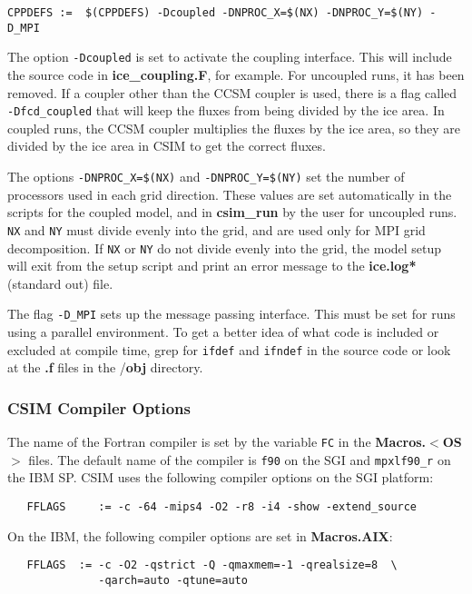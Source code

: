 \begin{verbatim}
CPPDEFS :=  $(CPPDEFS) -Dcoupled -DNPROC_X=$(NX) -DNPROC_Y=$(NY) -D_MPI
\end{verbatim}

The option {\tt -Dcoupled} is set to activate the coupling interface.  This 
will include the source code in {\bf ice\_coupling.F}, for example.  For uncoupled
runs, it has been removed.
If a coupler other than the CCSM coupler is used, there is a flag called
{\tt -Dfcd\_coupled} that will keep the fluxes from being divided by the ice area.
In coupled runs, the CCSM coupler multiplies the fluxes by the ice area, so
they are divided by the ice area in CSIM to get the correct fluxes.

The options {\tt -DNPROC\_X=\$(NX)} and {\tt -DNPROC\_Y=\$(NY)} set the number of
processors used in each grid direction.  These values are set automatically
in the scripts for the coupled model, and in {\bf csim\_run} by the user for
uncoupled runs.  {\tt NX} and {\tt NY} must divide evenly into the grid, and
are used only for MPI grid decomposition.  If {\tt NX} or {\tt NY} do not divide evenly
into the grid, the model setup will exit from the setup script
and print an error message to the {\bf ice.log*} (standard out) file.

The flag {\tt -D\_MPI} sets up the message passing interface.  This must be set
for runs using a parallel environment.  To get a better idea of what code
is included or excluded at compile time, grep for {\tt ifdef} and {\tt ifndef}
in the source code or look at the {\bf *.f} files in the /{\bf obj} directory.

\subsubsection{CSIM Compiler Options}

The name of the Fortran compiler is set by the variable {\tt FC} in the
{\bf Macros.$<$OS$>$} files.  The default name of the compiler is {\tt f90}
on the SGI and {\tt mpxlf90\_r} on the IBM SP.  CSIM uses the following compiler
options on the SGI platform:

\begin{verbatim}
   FFLAGS     := -c -64 -mips4 -O2 -r8 -i4 -show -extend_source
\end{verbatim}

On the IBM, the following compiler options are set in {\bf Macros.AIX}:

\begin{verbatim}
   FFLAGS  := -c -O2 -qstrict -Q -qmaxmem=-1 -qrealsize=8  \
              -qarch=auto -qtune=auto
\end{verbatim}

